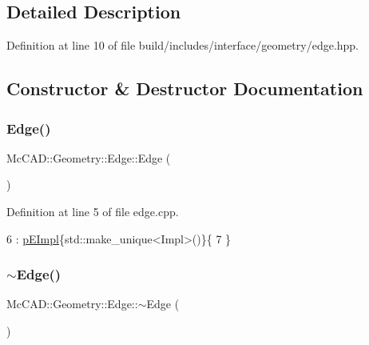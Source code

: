 \subsection{Detailed Description}


Definition at line 10 of file build/includes/interface/geometry/edge.\+hpp.



\subsection{Constructor \& Destructor Documentation}
\mbox{\label{classMcCAD_1_1Geometry_1_1Edge_ad957a8f3723cac10b2671c00f926afa7}} 
\subsubsection{\texorpdfstring{Edge()}{Edge()}\hspace{0.1cm}{\footnotesize\ttfamily [1/2]}}
{\footnotesize\ttfamily Mc\+C\+A\+D\+::\+Geometry\+::\+Edge\+::\+Edge (\begin{DoxyParamCaption}{ }\end{DoxyParamCaption})}



Definition at line 5 of file edge.\+cpp.


\begin{DoxyCode}
6   : \hyperlink{classMcCAD_1_1Geometry_1_1Edge_aefb1a25627999c87d4984bb505550626}{pEImpl}\{std::make\_unique<Impl>()\}\{
7 \}
\end{DoxyCode}
\mbox{\label{classMcCAD_1_1Geometry_1_1Edge_a9f51386d50723a6e1cc55c8620f28a45}} 
\subsubsection{\texorpdfstring{$\sim$\+Edge()}{~Edge()}\hspace{0.1cm}{\footnotesize\ttfamily [1/2]}}
{\footnotesize\ttfamily Mc\+C\+A\+D\+::\+Geometry\+::\+Edge\+::$\sim$\+Edge (\begin{DoxyParamCaption}{ }\end{DoxyParamCaption})}



